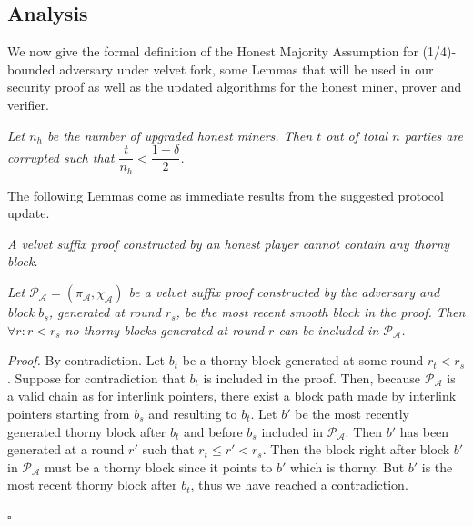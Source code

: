\subsection{Analysis}

We now give the formal definition of the Honest Majority Assumption for (1/4)-bounded adversary under velvet fork, some Lemmas that will be used in our security proof as well as the updated algorithms for the honest miner, prover and verifier.
\begin{definition}
	\textit{Let $n_h$ be the number of upgraded honest miners. Then $t$ out of total $n$
	parties are corrupted such that $\dfrac{t}{n_h} < \dfrac{1 - \delta}{2} $.}
	\label{defn:velvet_honest_majority}
\end{definition}

The following Lemmas come as immediate results from the suggested protocol
update.\\

\begin{lemma}
	\textit{A velvet suffix proof constructed by an honest player cannot contain
	any thorny block.}
	\label{lemm:smooth_honest_suffix}
\end{lemma}

\begin{lemma} 
	\textit{Let $\mathcal{P_A} = (\pi_\mathcal{A}, \chi_\mathcal{A})$
	be a velvet suffix proof constructed by the adversary and block $b_s$, generated at round $r_s$, be the most recent smooth block in the proof. Then $\forall r:r < r_s$ no thorny blocks generated at round $r$ can be included in $\mathcal{P_A}$.}
	\label{lemm:smooths_before_smooth}
\end{lemma}
\textit{Proof.} By contradiction. Let $b_t$ be a thorny block generated at some round $r_t < r_s$. Suppose for contradiction that $b_t$ is included in the proof. Then, because $\mathcal{P_A}$ is a valid chain as for interlink pointers, there exist a block path made by interlink pointers starting from $b_s$ and resulting to $b_t$. Let $b'$ be the most recently generated thorny block after $b_t$ and before $b_s$ included in $\mathcal{P_A}$. Then $b'$ has been generated at a round $r'$ such that $r_t \leq r' < r_s$. Then the block right after block $b'$ in $\mathcal{P_A}$ must be a thorny block since it points to $b'$ which is thorny. But $b'$ is the most recent thorny block after $b_t$, thus we have reached a contradiction.
\begin{flushright}
$\square$
\end{flushright}

